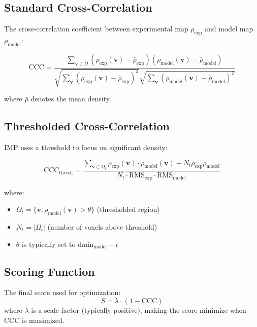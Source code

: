 \documentclass[12pt,a4paper]{article}
\begin{document}
\subsection{Standard Cross-Correlation}
The cross-correlation coefficient between experimental map $\rho_{\text{exp}}$ and model map $\rho_{\text{model}}$:

\begin{equation}
\text{CCC} = \frac{\sum_{\mathbf{v} \in \Omega} (\rho_{\text{exp}}(\mathbf{v}) - \bar{\rho}_{\text{exp}})(\rho_{\text{model}}(\mathbf{v}) - \bar{\rho}_{\text{model}})}{\sqrt{\sum_{\mathbf{v}} (\rho_{\text{exp}}(\mathbf{v}) - \bar{\rho}_{\text{exp}})^2} \sqrt{\sum_{\mathbf{v}} (\rho_{\text{model}}(\mathbf{v}) - \bar{\rho}_{\text{model}})^2}}
\end{equation}

where $\bar{\rho}$ denotes the mean density.

\subsection{Thresholded Cross-Correlation}
IMP uses a threshold to focus on significant density:

\begin{equation}
\text{CCC}_{\text{thresh}} = \frac{\sum_{\mathbf{v} \in \Omega_t} \rho_{\text{exp}}(\mathbf{v}) \cdot \rho_{\text{model}}(\mathbf{v}) - N_t \bar{\rho}_{\text{exp}} \bar{\rho}_{\text{model}}}{N_t \cdot \text{RMS}_{\text{exp}} \cdot \text{RMS}_{\text{model}}}
\end{equation}

where:
\begin{itemize}
    \item $\Omega_t = \{\mathbf{v} : \rho_{\text{model}}(\mathbf{v}) > \theta\}$ (thresholded region)
    \item $N_t = |\Omega_t|$ (number of voxels above threshold)
    \item $\theta$ is typically set to $\text{dmin}_{\text{model}} - \epsilon$
\end{itemize}

\subsection{Scoring Function}
The final score used for optimization:
\begin{equation}
S = \lambda \cdot (1 - \text{CCC})
\end{equation}
where $\lambda$ is a scale factor (typically positive), making the score minimize when CCC is maximized.
\end{document}
